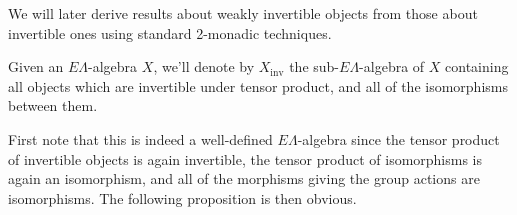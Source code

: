 \documentclass{amsbook} %
\numberwithin{section}{chapter}
\begin{document}
We will later derive results about weakly invertible objects from those about invertible ones using standard 2-monadic techniques.



\begin{Defi} Given an $E\Lambda$-algebra $X$, we'll denote by $X_{\mathrm{inv}}$ the sub-$E\Lambda$-algebra of $X$ containing all objects which are invertible under tensor product, and all of the isomorphisms between them. \end{Defi} 

First note that this is indeed a well-defined $E\Lambda$-algebra since the tensor product of invertible objects is again invertible, the tensor product of isomorphisms is again an isomorphism, and all of the morphisms giving the group actions are isomorphisms. The following proposition is then obvious.
\end{document}
